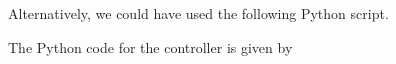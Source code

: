 Alternatively, we could have used the following Python script.


The Python code for the controller is given by



